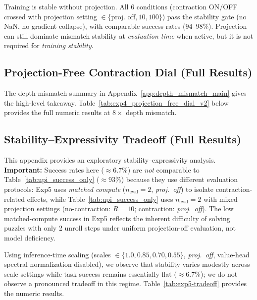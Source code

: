 \documentclass{article}
\theoremstyle{plain}
\theoremstyle{definition}
\theoremstyle{remark}
\begin{document}


Training is stable without projection. All 6 conditions (contraction ON/OFF crossed with projection setting $\in\{\text{proj.\ off}, 10, 100\}$) pass the stability gate (no NaN, no gradient collapse), with comparable success rates ($94$--$98\%$). Projection can still dominate mismatch stability at \emph{evaluation time} when active, but it is not required for \emph{training stability}.

\subsection{Projection-Free Contraction Dial (Full Results)}
\label{app:exp4_projection_free_dial_v2}

The depth-mismatch summary in Appendix~\ref{app:depth_mismatch_main} gives the high-level takeaway.
Table~\ref{tab:exp4_projection_free_dial_v2} below provides the full numeric results at $8\times$ depth mismatch.



\subsection{Stability--Expressivity Tradeoff (Full Results)}
\label{app:exp5_tradeoff_curve}

This appendix provides an exploratory stability--expressivity analysis.
\textbf{Important:} Success rates here (${\approx}6.7\%$) are \emph{not} comparable to Table~\ref{tab:upi_success_only} (${\approx}93\%$) because they use different evaluation protocols: Exp5 uses \emph{matched compute} ($n_\mathrm{eval}{=}2$, \emph{proj.\ off}) to isolate contraction-related effects, while Table~\ref{tab:upi_success_only} uses $n_\mathrm{eval}{=}2$ with mixed projection settings (no-contraction: $R{=}10$; contraction: \emph{proj.\ off}). The low matched-compute success in Exp5 reflects the inherent difficulty of solving puzzles with only 2 unroll steps under uniform projection-off evaluation, not model deficiency.

Using inference-time scaling (scales $\in \{1.0, 0.85, 0.70, 0.55\}$, \emph{proj.\ off}, value-head spectral normalization disabled), we observe that stability varies modestly across scale settings while task success remains essentially flat ($\approx 6.7\%$); we do not observe a pronounced tradeoff in this regime.
Table~\ref{tab:exp5-tradeoff} provides the numeric results.
\end{document}
